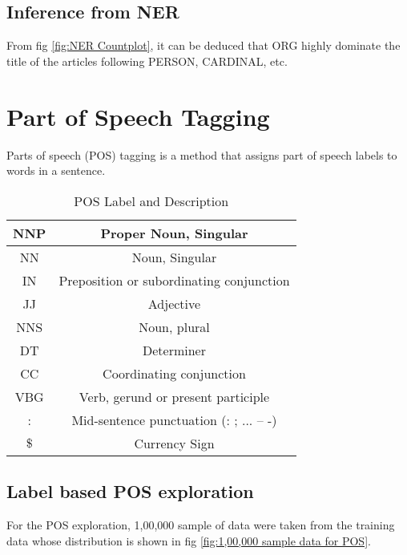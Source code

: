 \subsection{Inference from NER}
From fig \ref{fig:NER Countplot}, it can be deduced that ORG highly dominate the title of the articles following PERSON, CARDINAL, etc.

\section{Part of Speech Tagging}
Parts of speech (POS) tagging is a method that assigns part of speech labels to words in a sentence.




\begin{table}[H]
    \begin{center}
        \begin{tabular}{ |c|c| }
            \hline
            NNP & Proper Noun, Singular \\
            \hline
            NN & Noun, Singular \\
            \hline
            IN & Preposition or subordinating conjunction \\
            \hline
            JJ & Adjective \\
            \hline
            NNS & Noun, plural \\
            \hline
            DT & Determiner \\
            \hline
            CC & Coordinating conjunction \\
            \hline
            VBG & Verb, gerund or present participle \\
            \hline 
            : & Mid-sentence punctuation (: ; ... -- -) \\
            \hline 
            $\$$ & Currency Sign \\
            \hline
        \end{tabular}
    \end{center}
    \caption{POS Label and Description}
    \label{table:POS Label and Description}
\end{table}


\subsection{Label based POS exploration}
For the POS exploration, 1,00,000 sample of data were taken from the training data whose distribution is shown in fig \ref{fig:1,00,000 sample data for POS}.

